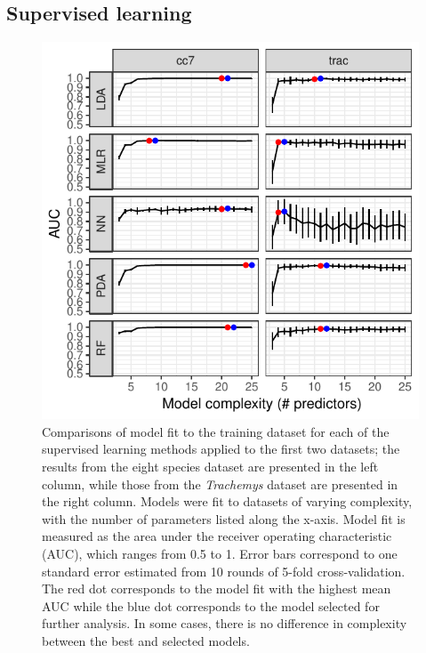 \documentclass[10pt,letterpaper]{article}
\begin{document}
\subsection*{Supervised learning}

\begin{figure}[h]
  \centering
  \includegraphics[height = 0.5\textheight, width = \textwidth, keepaspectratio = true]{figure/other_model_sel}
  \caption{Comparisons of model fit to the training dataset for each of the supervised learning methods applied to the first two datasets; the results from the eight species dataset are presented in the left column, while those from the \textit{Trachemys} dataset are presented in the right column. Models were fit to datasets of varying complexity, with the number of parameters listed along the x-axis. Model fit is measured as the area under the receiver operating characteristic (AUC), which ranges from 0.5 to 1. Error bars correspond to one standard error estimated from 10 rounds of 5-fold cross-validation. The red dot corresponds to the model fit with the highest mean AUC while the blue dot corresponds to the model selected for further analysis. In some cases, there is no difference in complexity between the best and selected models.}
  \label{fig:other_sel}
\end{figure}
\end{document}
